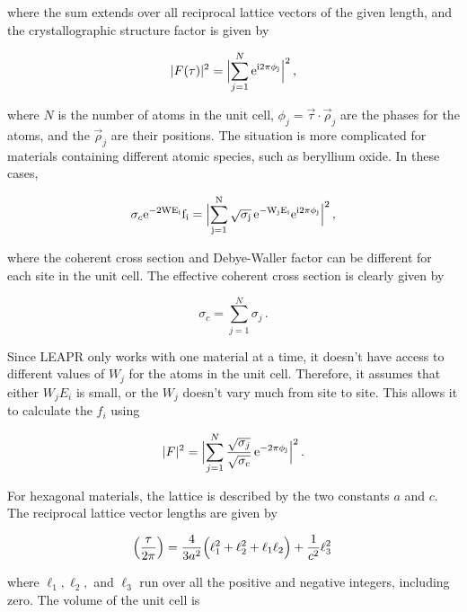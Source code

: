 \noindent
where the sum extends over all reciprocal lattice vectors of the given
length, and the crystallographic structure factor is given by

\begin{equation}
  |F(\tau)|^2=\Bigl|\sum_{j=1}^{N}\rm e^{i2\pi\phi_j}\Bigr|^2\,,
\end{equation}

\noindent
where $N$ is the number of atoms in the unit cell,
$\phi_j=\vec{\tau}\cdot\vec{\rho}_j$
are the phases for the atoms, and the $\vec{\rho}_j$ are their positions.
The situation is more complicated for materials containing different
atomic species, such as beryllium oxide.  In these cases,

\begin{equation}
   \sigma_c\rm e^{-2WE_i}f_i=\Bigl|\sum_{j=1}^{N}
      \sqrt{\sigma_j}\,\rm e^{-W_jE_i}\rm e^{i2\pi\phi_j}\Bigr|^2\,,
\end{equation}

\noindent
where the coherent cross section and Debye-Waller factor can be different
for each site in the unit cell.  The effective coherent cross section is
clearly given by

\begin{equation}
   \sigma_c=\sum_{j=1}^{N}\sigma_j\,.
\end{equation}

\noindent
Since LEAPR only works with one material at a time, it doesn't have access
to different values of $W_j$ for the atoms in the unit cell.  Therefore, it
assumes that either $W_jE_i$ is small, or the $W_j$ doesn't vary much from
site to site.  This allows it to calculate the $f_i$ using

\begin{equation}
   |F|^2=\Bigl|\sum_{j=1}^N\frac{\sqrt{\sigma_j}}{\sqrt{\sigma_c}}
      \,\rm e^{-2\pi\phi_j}\Bigr|^2\,.
\end{equation}
\vspace{0.5 pt}

\noindent
For hexagonal materials, the lattice is described by the two constants
$a$ and $c$.  The reciprocal lattice vector lengths are given by

\begin{equation}
   \Bigl(\frac{\tau}{2\pi}\Bigr)=\frac{4}{3a^2}
      \Bigl(\ell_1^2+\ell_2^2+\ell_1\ell_2\Bigr)
      +\frac{1}{c^2}\ell_3^2\,
\end{equation}
\vspace{0.5 pt}

\noindent
where $\ell_1,\ell_2,$ and $\ell_3$ run over all the positive and negative
integers, including zero.  The volume of the unit cell is

